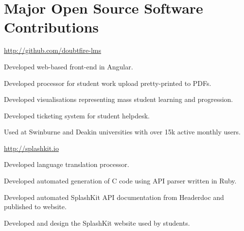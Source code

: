 \section{Major Open Source Software Contributions}

\begin{multicols}{2}

{}
{
}
{\href{http://github.com/doubtfire-lms}{http://github.com/doubtfire-lms}}
{
  \item Developed web-based front-end in Angular.
  \item Developed processor for student work upload pretty-printed to PDFs.
  \item Developed visualisations representing mass student learning and progression.
  \item Developed ticketing system for student helpdesk.
  \item Used at Swinburne and Deakin universities with over 15k active monthly users.
}

\columnbreak

{}
{
}
{\href{http://splashkit.io}{http://splashkit.io}}
{
  \item Developed language translation processor.
  \item Developed automated generation of C code using API parser written in Ruby.
  \item Developed automated SplashKit API documentation from Headerdoc and published to website.
  \item Developed and design the SplashKit website used by students.
}

\end{multicols}